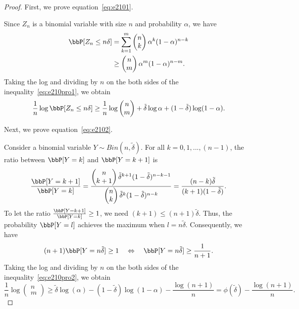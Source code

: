 \documentclass[11pt]{article}
\theoremstyle{plain}
\theoremstyle{definition}
\begin{document}
\begin{proof}
	First, we prove equation~\eqref{eq:e2101}.
	
	\vspace{0.2cm}
	Since $Z_n$ is a binomial variable with size $n$ and probability $\alpha$, we have
	\begin{align}
		\bbP[Z_n \leq n\delta ] &= \sum_{k = 1}^m \begin{pmatrix}
			n \\ k
		\end{pmatrix} \alpha^k (1-\alpha)^{n - k}\\
		& \geq \begin{pmatrix}
			n \\ m
		\end{pmatrix} \alpha^m (1-\alpha)^{n - m}. \label{eq:e210pro1}
	\end{align}
	Taking the log and dividing by $n$ on the both sides of the inequality~\eqref{eq:e210pro1}, we obtain
	\[ \frac{1}{n} \log \bbP[Z_n \leq n\delta ] \geq \frac{1}{n} \log \begin{pmatrix}
			n \\ m		\end{pmatrix} + \tilde \delta \log \alpha + (1 - \tilde \delta ) \log (1-\alpha). \]
			
	\vspace{0.2cm}
	Next, we prove equation~\eqref{eq:e2102}.
	
	\vspace{0.2cm}
	Consider a binomial variable $Y \sim Bin(n,\tilde \delta)$. For all $k = 0,1,...,(n-1)$, the ratio between $\bbP[Y = k]$ and $\bbP[Y = k+1]$ is
	\begin{equation}
		\frac{\bbP[Y = k+1]}{\bbP[Y = k]} = \frac{\begin{pmatrix}
			n \\ k+1
		\end{pmatrix} \tilde \delta^{k+1} (1-\tilde \delta)^{n - k -1} }{\begin{pmatrix}
			n \\ k
		\end{pmatrix} \tilde \delta^{k} (1-\tilde \delta)^{n - k }} = \frac{(n-k) \tilde \delta}{(k+1) (1- \tilde \delta)  }.
	\end{equation}
	To let the ratio $	\frac{\bbP[Y = k+1]}{\bbP[Y = k]} \geq 1$, we need $(k+1)\leq (n+1) \tilde \delta $. Thus, the probability $\bbP[Y = l]$ achieves the maximum when $l = n \tilde \delta$. Consequently, we have
	\begin{equation}\label{eq:e210pro2}
		(n+1) \bbP[Y = n \tilde \delta] \geq 1 \quad \Leftrightarrow \quad  \bbP[Y = n \tilde \delta] \geq \frac{1}{n+1}.
	\end{equation}
	Taking the log and dividing by $n$ on the both sides of the inequality~\eqref{eq:e210pro2}, we obtain
	\begin{equation}
		 \frac{1}{n} \log \begin{pmatrix}
			n \\ m		\end{pmatrix} \geq \tilde \delta \log(\alpha) - (1 - \tilde \delta)\log(1 - \alpha) - \frac{\log(n+1)}{n} = \phi(\tilde \delta)  - \frac{\log(n+1)}{n}.
	\end{equation}
	

\end{proof}
\end{document}

